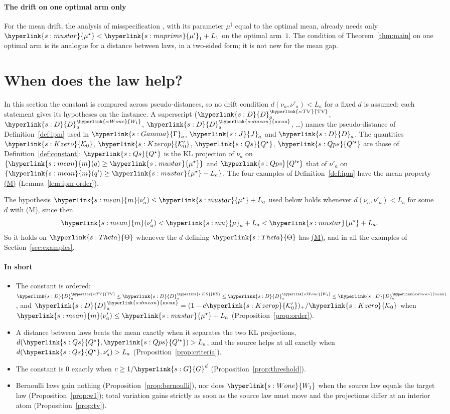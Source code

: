 \documentclass[11pt]{article}
\newcommand{\sy}[2]{{\hyperlink{#1}{#2}}}
\newcommand{\term}[2]{\hyperlink{#1}{#2}}
\newcommand{\mean}{\sy{s:mean}{m}}
\newcommand{\TV}{\sy{s:TV}{\mathrm{TV}}}
\newcommand{\KSd}{\sy{s:KS}{\mathrm{KS}}}
\newcommand{\Wone}{\sy{s:Wone}{W_{1}}}
\newcommand{\dmean}{\sy{s:dmean}{\mathrm{mean}}}
\newcommand{\propM}{\term{s:M}{(M)}}
\newcommand{\mk}{\sy{s:mu}{\mu}}
\newcommand{\mus}{\sy{s:mustar}{\mu^{\star}}}
\newcommand{\mkp}{\sy{s:muprime}{\mu'}}
\newcommand{\Thet}{\sy{s:Theta}{\Theta}}
\newcommand{\Pairs}{\sy{s:Gamma}{\Gamma}}
\newcommand{\Jf}{\sy{s:J}{J}}
\newcommand{\Dc}{\sy{s:D}{D}}
\newcommand{\Ko}{\sy{s:Kzero}{\mathcal{K}_{0}}}
\newcommand{\Kop}{\sy{s:Kzerop}{\mathcal{K}'_{0}}}
\newcommand{\Qs}{\sy{s:Qs}{Q^{\star}}}
\newcommand{\Qps}{\sy{s:Qps}{Q'^{\star}}}
\newcommand{\Gd}{\sy{s:G}{G}}
\begin{document}
\paragraph{The drift on one optimal arm only} For the mean drift, the analysis of misspecification
\citep[Theorem~5]{PMRM26}, with its parameter $\mu^\dagger$ equal to the optimal mean, already needs
only $\mus<\mkp_1+L_1$ on the optimal arm~$1$. The condition of Theorem~\ref{thm:main} on one
optimal arm is its analogue for a distance between laws, in a two-sided form; it is not new for the
mean gap.
\section{When does the law help?}\label{sec:structure}

In this section the constant is compared across pseudo-distances, so no drift condition
$d(\nu_a,\nu'_a)<L_a$ for a fixed $d$ is assumed: each statement gives its hypotheses on the
instance. A superscript ($\Dc^{\TV}_a$, $\Dc^{\Wone}_a$, $\Dc^{\dmean}_a$, \dots) names the pseudo-distance
of Definition~\ref{def:ipm} used in $\Pairs_a$, $\Jf_a$ and $\Dc_a$. The quantities $\Ko$, $\Kop$, $\Qs$,
$\Qps$ are those of Definition~\ref{def:constant}: $\Qs$ is the KL projection of $\nu_a$ on
$\{\mean(q)\ge\mus\}$ and $\Qps$ that of $\nu'_a$ on $\{\mean(q')\ge\mus-L_a\}$. The four examples
of Definition~\ref{def:ipm} have the mean property \propM{} (Lemma~\ref{lem:ipm-order}).

The hypothesis $\mean(\nu'_a)\le\mus+L_a$ used below holds whenever $d(\nu_a,\nu'_a)<L_a$ for some
$d$ with \propM{}, since then
\begin{equation*}
\mean(\nu'_a)<\mk_a+L_a<\mus+L_a .
\end{equation*}
So it holds on $\Thet$ whenever the $d$ defining $\Thet$ has \propM{}, and in all the examples of
Section~\ref{sec:examples}.

\paragraph{In short}
\begin{itemize}
\item The constant is ordered: $\Dc^{\TV}_a\le \Dc^{\KSd}_a\le \Dc^{\Wone}_a\le \Dc^{\dmean}_a$, and
  $\Dc^{\dmean}_a=(1-c\Kop)_+/\Ko$ when $\mean(\nu'_a)\le\mus+L_a$
  (Proposition~\ref{prop:order}).
\item A distance between laws beats the mean exactly when it separates the two KL projections,
  $d(\Qs,\Qps)>L_a$, and the source helps at all exactly when $d(\Qs,\nu'_a)>L_a$
  (Proposition~\ref{prop:criteria}).
\item The constant is $0$ exactly when $c\ge1/\Gd^d$ (Proposition~\ref{prop:threshold}).
\item Bernoulli laws gain nothing (Proposition~\ref{prop:bernoulli}), nor does $\Wone$ when the
  source law equals the target law (Proposition~\ref{prop:w1}); total variation gains strictly as
  soon as the source law must move and the projections differ at an interior atom
  (Proposition~\ref{prop:tv}).
\end{itemize}
\end{document}
